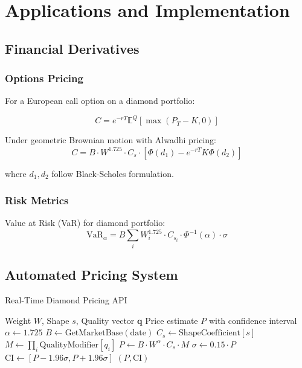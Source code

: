 \documentclass[12pt,a4paper]{article}
\theoremstyle{definition}
\theoremstyle{remark}
\begin{document}
\section{Applications and Implementation}

\subsection{Financial Derivatives}

\subsubsection{Options Pricing}

For a European call option on a diamond portfolio:

\begin{equation}
C = e^{-rT} \mathbb{E}^Q[\max(P_T - K, 0)]
\end{equation}

Under geometric Brownian motion with Alwadhi pricing:
\begin{equation}
C = B \cdot W^{1.725} \cdot C_s \cdot [\Phi(d_1) - e^{-rT}K\Phi(d_2)]
\end{equation}

where $d_1, d_2$ follow Black-Scholes formulation.

\subsubsection{Risk Metrics}

Value at Risk (VaR) for diamond portfolio:
\begin{equation}
\text{VaR}_{\alpha} = B \sum_{i} W_i^{1.725} \cdot C_{s_i} \cdot \Phi^{-1}(\alpha) \cdot \sigma
\end{equation}

\subsection{Automated Pricing System}

\begin{algorithm}
\caption{Real-Time Diamond Pricing API}
\begin{algorithmic}
\REQUIRE Weight $W$, Shape $s$, Quality vector $\mathbf{q}$
\ENSURE Price estimate $P$ with confidence interval
\STATE
\STATE $\alpha \leftarrow 1.725$
\STATE $B \leftarrow \text{GetMarketBase}(\text{date})$
\STATE $C_s \leftarrow \text{ShapeCoefficient}[s]$
\STATE $M \leftarrow \prod_{i} \text{QualityModifier}[q_i]$
\STATE $P \leftarrow B \cdot W^{\alpha} \cdot C_s \cdot M$
\STATE $\sigma \leftarrow 0.15 \cdot P$ 
\STATE $\text{CI} \leftarrow [P - 1.96\sigma, P + 1.96\sigma]$
\RETURN $(P, \text{CI})$
\end{algorithmic}
\end{algorithm}
\end{document}
